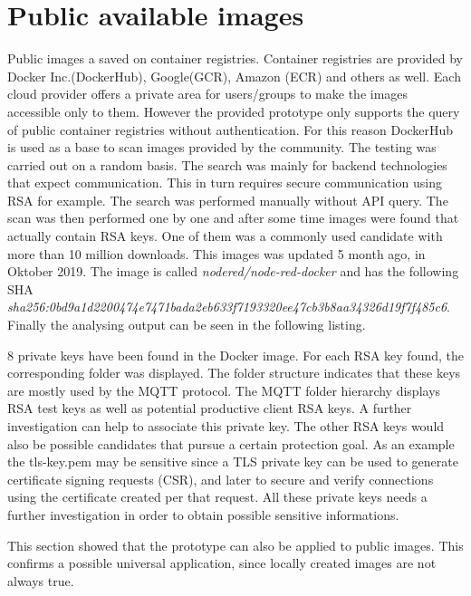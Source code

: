 \section{Public available images}
\label{ch:eval:public_images}
Public images a saved on container registries. Container registries are provided by Docker Inc.(DockerHub), Google(GCR), Amazon (ECR) and others as well.   
Each cloud provider offers a private area for users/groups to make the images accessible only to them. However the provided prototype only supports the query of public container registries without authentication.
For this reason DockerHub is used as a base to scan images provided by the community. The testing was carried out on a random basis.
The search was mainly for backend technologies that expect communication. This in turn requires secure communication using RSA for example.
The search was performed manually without API query. The scan was then performed one by one and after some time images were found that actually contain RSA keys. 
One of them was a commonly used candidate with more than 10 million downloads. This images was updated 5 month ago, in Oktober 2019. 
The image is called \textit{nodered/node-red-docker} and has the following SHA \textit{sha256:0bd9a1d2200474e7471bada2eb633f7193320ee47cb3b8aa34326d19f7f485c6}.
Finally the analysing output can be seen in the following listing.

8 private keys have been found in the Docker image. For each RSA key found, the corresponding folder was displayed. The folder structure indicates that these keys are mostly used by the MQTT protocol.
The MQTT folder hierarchy displays RSA test keys as well as potential productive client RSA keys. A further investigation can help to associate this private key.
The other RSA keys would also be possible candidates that pursue a certain protection goal. As an example the tls-key.pem may be sensitive since a TLS private key can be used to generate certificate signing requests (CSR), and later to secure and verify connections using the certificate created per that request. All these private keys needs a further investigation in order to obtain possible sensitive informations.

This section showed that the prototype can also be applied to public images. This confirms a possible universal application, since locally created images are not always true.
